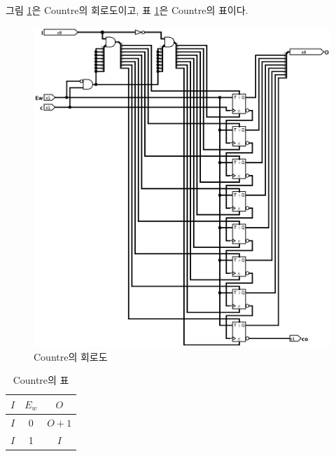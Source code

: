 \documentclass{article}
\renewcommand{\figurename}{그림}
\renewcommand{\tablename}{표}
\begin{document}
\figurename{} \ref{fig:ctr}은 Countre의 회로도이고,
\tablename{} \ref{tab:ctr}은 Countre의 표이다.

\begin{figure}[h]
    \centering
    \includegraphics[scale=0.35]{Countre}
    \caption{Countre의 회로도}
    \label{fig:ctr}
\end{figure}

\begin{table}[h]
    \centering
    \begin{tabular}{cc|c}
        $I$ & $E_w$ & $O$ \\
        \hline
        $I$ & 0 & $O+1$ \\
        $I$ & 1 & $I$ \\
    \end{tabular}
    \caption{Countre의 표}
    \label{tab:ctr}
\end{table}
\end{document}
